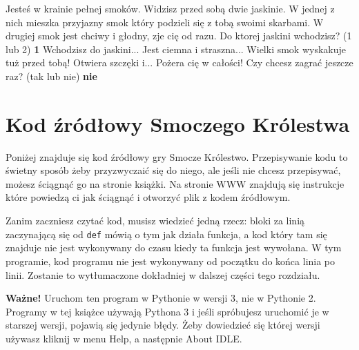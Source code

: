 \documentclass{book}
\begin{document}
\begin{pseudolisting}
Jesteś w krainie pełnej smoków. Widzisz przed sobą\linebreak
dwie jaskinie. W jednej z nich mieszka przyjazny smok\linebreak
który podzieli się z tobą swoimi skarbami. W drugiej\linebreak
smok jest chciwy i głodny, zje cię od razu.\linebreak
\linebreak
Do ktorej jaskini wchodzisz? (1 lub 2)\linebreak
{\bf 1}\linebreak
Wchodzisz do jaskini...\linebreak
Jest ciemna i straszna...\linebreak
Wielki smok wyskakuje tuż przed tobą! Otwiera szczęki i...\linebreak
\linebreak
Pożera cię w całości!\linebreak
Czy chcesz zagrać jeszcze raz? (tak lub nie)\linebreak
{\bf nie}\linebreak                                                   
\linebreak
\end{pseudolisting}

\section{Kod źródłowy Smoczego Królestwa}

Poniżej znajduje się kod źródłowy gry Smocze Królestwo. Przepisywanie kodu to świetny sposób żeby przyzwyczaić się do niego, ale jeśli nie chcesz przepisywać, możesz ściągnąć go na stronie książki. %
Na stronie WWW znajdują się instrukcje które powiedzą ci jak ściągnąć i otworzyć plik z kodem źródłowym. %

Zanim zaczniesz czytać kod, musisz wiedzieć jedną rzecz: bloki za linią zaczynającą się od \lstinline{def} mówią o tym jak działa funkcja, a kod który tam się znajduje nie jest wykonywany do czasu kiedy ta funkcja jest wywołana. W tym programie, kod programu nie jest wykonywany od początku do końca linia po linii. Zostanie to wytłumaczone dokładniej w dalszej części tego rozdziału.

{\bf Ważne!} Uruchom ten program w Pythonie w wersji 3, nie w Pythonie 2. Programy w tej książce używają Pythona 3 i jeśli spróbujesz uruchomić je w starszej wersji, pojawią się jedynie błędy. Żeby dowiedzieć się której wersji używasz kliknij w menu Help, a następnie About IDLE.
\end{document}
